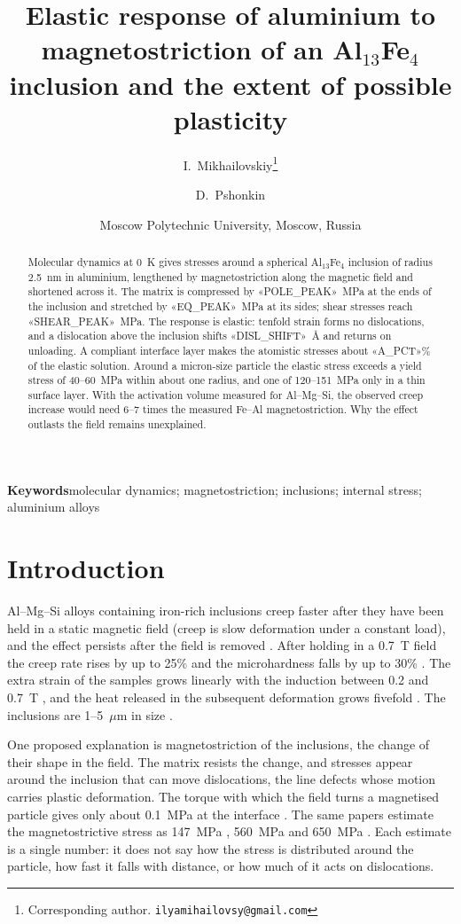 \documentclass[11pt,a4paper]{article}
\title{Elastic response of aluminium to magnetostriction of an Al$_{13}$Fe$_4$
inclusion and the extent of possible plasticity}
\author{I.~Mikhailovskiy\thanks{Corresponding author.
\texttt{ilyamihailovsy@gmail.com}} \and D.~Pshonkin}
\date{Moscow Polytechnic University, Moscow, Russia}
\begin{document}
\maketitle

\begin{abstract}
Molecular dynamics at 0~K gives stresses around a spherical
Al$_{13}$Fe$_4$ inclusion of radius 2.5~nm in aluminium, lengthened by
magnetostriction along the magnetic field and shortened across it. The
matrix is compressed by «POLE_PEAK»~MPa at the ends of the inclusion and
stretched by «EQ_PEAK»~MPa at its sides; shear stresses reach
«SHEAR_PEAK»~MPa. The response is elastic: tenfold strain forms no
dislocations, and a dislocation above the inclusion shifts
«DISL_SHIFT»~\AA{} and returns on unloading. A compliant interface layer
makes the atomistic stresses about «A_PCT»\% of the elastic solution.
Around a micron-size particle the elastic stress exceeds a yield stress of
40--60~MPa within about one radius, and one of 120--151~MPa only in a thin
surface layer. With the activation volume
measured for Al--Mg--Si, the observed creep increase would need 6--7 times
the measured Fe--Al magnetostriction. Why the effect outlasts the field
remains unexplained.
\end{abstract}

\noindent\textbf{Keywords}\quad molecular dynamics; magnetostriction;
inclusions; internal stress; aluminium alloys

\section{Introduction}

Al--Mg--Si alloys containing iron-rich inclusions creep faster after they
have been held in a static magnetic field (creep is slow deformation under a
constant load), and the effect persists after the field is removed
\cite{Skvortsov2019JAP,Skvortsov2019PSS,Friha2024JMMM,Nikolaev2025SciRep}.
After holding in a 0.7~T field the creep rate rises by up to 25\% and the
microhardness falls by up to 30\% \cite{Skvortsov2019JAP}. The extra strain
of the samples grows linearly with the induction between 0.2 and 0.7~T
\cite{Friha2024JMMM}, and the heat released in the subsequent deformation
grows fivefold \cite{Pshonkin2025ZL}. The inclusions are 1--5~$\mu$m in size
\cite{Skvortsov2019JAP,Pshonkin2025ZL}.

One proposed explanation is magnetostriction of the inclusions, the change of
their shape in the field. The matrix resists the change, and stresses appear
around the inclusion that can move dislocations, the line defects whose
motion carries plastic deformation. The torque with which the field turns a
magnetised particle gives only about 0.1~MPa at the interface
\cite{Skvortsov2019JAP}. The same papers estimate the magnetostrictive stress
as 147~MPa \cite{Friha2024JMMM}, 560~MPa \cite{Skvortsov2019JAP} and
650~MPa \cite{Friha2023PSS}. Each estimate is a single number: it does not
say how the stress is distributed around the particle, how fast it falls
with distance, or how much of it acts on dislocations.
\end{document}
